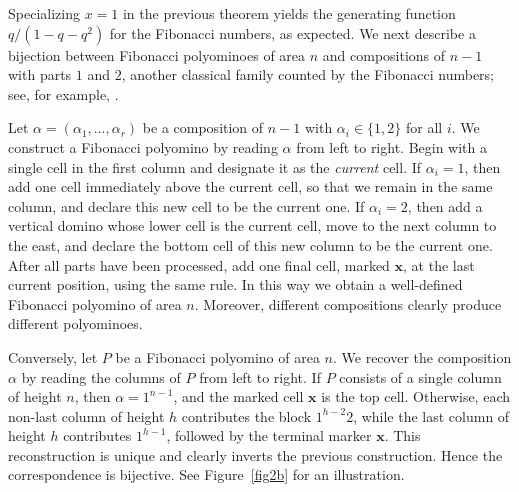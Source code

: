 \documentclass[12pt]{amsart}
\theoremstyle{plain}
\theoremstyle{definition}
\begin{document}
Specializing $x=1$ in the previous theorem yields the generating function $q/(1-q-q^2)$ for the Fibonacci numbers, as expected. We next describe a bijection between Fibonacci polyominoes of area $n$ and compositions of $n-1$ with parts $1$ and $2$, another classical family counted by the Fibonacci numbers; see, for example, \cite{HeubachMansour}.


Let $\alpha=(\alpha_1,\dots,\alpha_r)$ be a composition of $n-1$ with
$\alpha_i\in\{1,2\}$ for all $i$. We construct a Fibonacci polyomino by
reading $\alpha$ from left to right. Begin with a single cell in the first
column and designate it as the \emph{current} cell. If $\alpha_i=1$, then
add one cell immediately above the current cell, so that we remain in the
same column, and declare this new cell to be the current one. If
$\alpha_i=2$, then add a vertical domino whose lower cell is the current
cell, move to the next column to the east, and declare the bottom cell of
this new column to be the current one. After all parts have been processed,
add one final cell, marked $\mathbf{x}$, at the last current position, using
the same rule. In this way we obtain a well-defined Fibonacci polyomino of
area $n$. Moreover, different compositions clearly produce different
polyominoes.

Conversely, let $P$ be a Fibonacci polyomino of area $n$. We recover the
composition $\alpha$ by reading the columns of $P$ from left to right. If $P$
consists of a single column of height $n$, then $\alpha=1^{n-1}$, and the
marked cell $\mathbf{x}$ is the top cell. Otherwise, each non-last column of
height $h$ contributes the block $1^{h-2}2$, while the last column of height
$h$ contributes $1^{h-1}$, followed by the terminal marker $\mathbf{x}$. This
reconstruction is unique and clearly inverts the previous construction.
Hence the correspondence is bijective. See Figure~\ref{fig2b} for an
illustration.
\end{document}
